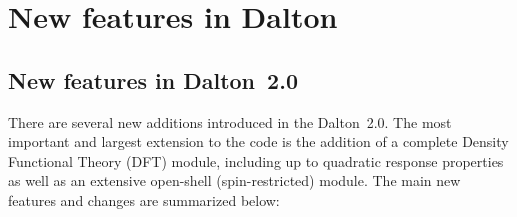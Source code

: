 \chapter{New features in Dalton}

\section{New features in Dalton~2.0}

There are several new additions introduced in the Dalton~2.0. The most
important and largest extension to the code is the addition of a
complete Density Functional Theory (DFT) module, including up to quadratic
response properties as well as an extensive open-shell
(spin-restricted) module. The main new features and changes are
summarized below:

